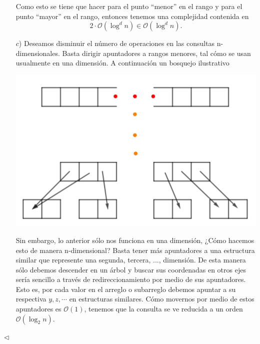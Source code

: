 \begin{enumerate}
  Como esto se tiene que hacer para el punto ``menor'' en el rango y para el punto ``mayor''
  en el rango,  entonces tenemos una complejidad contenida en
  \[2 \cdot \mathcal{O}(\log^d n) \in \mathcal{O}(\log^d n).\]
\item[$c$)] Deseamos disminuir el número de operaciones en las consultas n-dimensionales. Basta dirigir
apuntadores a rangos menores, tal cómo se usan usualmente en una dimensión. A continuación un bosquejo
ilustrativo
\begin{center}
    \includegraphics[scale=0.2]{Range1}
\end{center}
Sin embargo, lo anterior sólo nos funciona en una dimensión, ¿Cómo hacemos esto de manera n-dimensional?
Basta tener más apuntadores a una estructura similar que represente una segunda, tercera, ..., dimensión.
De esta manera sólo debemos descender en un árbol y buscar sus coordenadas en otros ejes sería sencillo
a través de redireccionamiento por medio de sus apuntadores. Esto es, por cada valor en el arreglo o subarreglo
debemos apuntar a su respectiva $y, z, \dotsm$ en estructuras similares. Cómo movernos por medio de estos
apuntadores es $\mathcal{O}(1)$, tenemos que la consulta se ve reducida a un orden $\mathcal{O}(\log_2 n)$.
\end{enumerate}
\hfill $\lhd$
